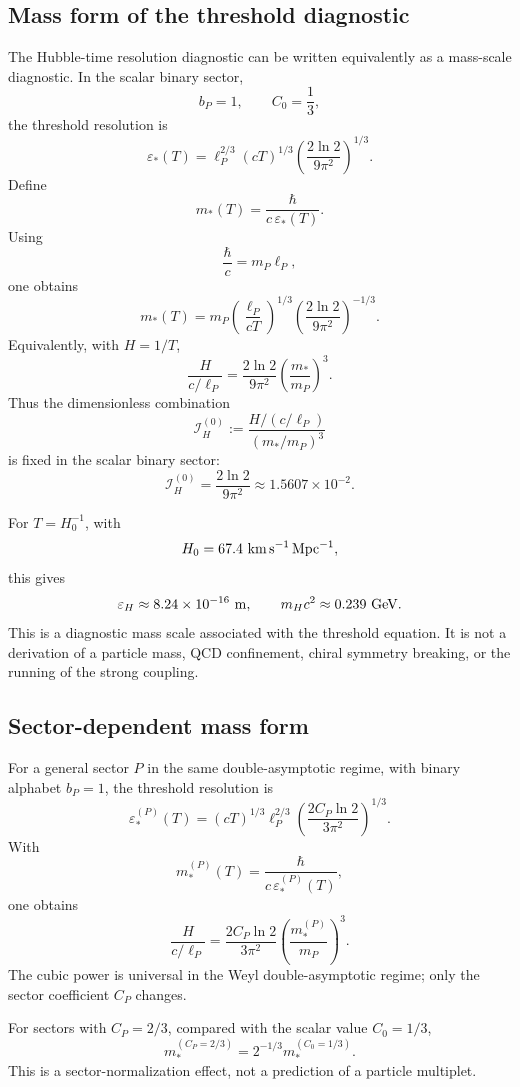 \documentclass[11pt,a4paper]{article}
\begin{document}
\subsection{Mass form of the threshold diagnostic}
\label{app:mass-form-threshold-diagnostic}

The Hubble-time resolution diagnostic can be written equivalently as a mass-scale diagnostic.  In the scalar binary sector,
\[
b_P=1,
\qquad
C_0=\frac13,
\]
the threshold resolution is
\[
\varepsilon_*(T)
=
\ell_P^{2/3}(cT)^{1/3}
\left(\frac{2\ln2}{9\pi^2}\right)^{1/3}.
\]
Define
\[
m_*(T)=\frac{\hbar}{c\,\varepsilon_*(T)}.
\]
Using
\[
\frac{\hbar}{c}=m_P\ell_P,
\]
one obtains
\[
m_*(T)
=
m_P
\left(\frac{\ell_P}{cT}\right)^{1/3}
\left(\frac{2\ln2}{9\pi^2}\right)^{-1/3}.
\]
Equivalently, with \(H=1/T\),
\[
\frac{H}{c/\ell_P}
=
\frac{2\ln2}{9\pi^2}
\left(\frac{m_*}{m_P}\right)^3.
\]
Thus the dimensionless combination
\[
\mathcal I_H^{(0)}
:=
\frac{H/(c/\ell_P)}
{(m_*/m_P)^3}
\]
is fixed in the scalar binary sector:
\[
\mathcal I_H^{(0)}
=
\frac{2\ln2}{9\pi^2}
\approx1.5607\times10^{-2}.
\]

For \(T=H_0^{-1}\), with
\[
H_0=67.4\ {\rm km\,s^{-1}\,Mpc^{-1}},
\]
this gives
\[
\varepsilon_H\approx8.24\times10^{-16}\ {\rm m},
\qquad
m_Hc^2\approx0.239\ {\rm GeV}.
\]
This is a diagnostic mass scale associated with the threshold equation.  It is not a derivation of a particle mass, QCD confinement, chiral symmetry breaking, or the running of the strong coupling.

\subsection{Sector-dependent mass form}
\label{app:sector-dependent-mass-form}

For a general sector \(P\) in the same double-asymptotic regime, with binary alphabet \(b_P=1\), the threshold resolution is
\[
\varepsilon_*^{(P)}(T)
=
(cT)^{1/3}\ell_P^{2/3}
\left(
\frac{2C_P\ln2}{3\pi^2}
\right)^{1/3}.
\]
With
\[
m_*^{(P)}(T)
=
\frac{\hbar}{c\,\varepsilon_*^{(P)}(T)},
\]
one obtains
\[
\frac{H}{c/\ell_P}
=
\frac{2C_P\ln2}{3\pi^2}
\left(
\frac{m_*^{(P)}}{m_P}
\right)^3.
\]
The cubic power is universal in the Weyl double-asymptotic regime; only the sector coefficient \(C_P\) changes.

For sectors with \(C_P=2/3\), compared with the scalar value \(C_0=1/3\),
\[
m_*^{(C_P=2/3)}
=
2^{-1/3}m_*^{(C_0=1/3)}.
\]
This is a sector-normalization effect, not a prediction of a particle multiplet.
\end{document}
